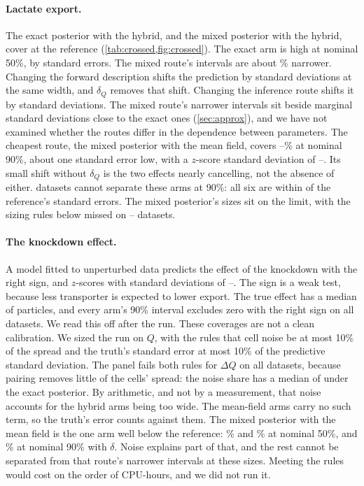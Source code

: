 \paragraph{Lactate export.} The exact posterior with the hybrid, and the mixed posterior
with the hybrid, cover at the reference (\cref{tab:crossed,fig:crossed}). The exact arm
is high at nominal 50\%, by  standard errors. The mixed route's
intervals are about \% narrower. Changing the forward description
shifts the prediction by  standard deviations at the same width, and $\delta_Q$ removes that shift. Changing the inference route shifts it by  standard deviations. The mixed route's narrower intervals sit beside marginal standard deviations close to the exact ones (\cref{sec:approx}), and we have not examined whether the routes differ in the dependence between parameters. The cheapest route, the mixed posterior with the mean field, covers
--\% at nominal 90\%, about one standard error low, with a $z$-score standard deviation of --. Its small shift without $\delta_Q$ is the two effects nearly cancelling, not the absence of
either.  datasets cannot separate these arms at 90\%: all six are within  of the reference's standard errors. The mixed posterior's sizes sit on the limit, with the sizing rules below missed on -- datasets.

\paragraph{The knockdown effect.} A model fitted to unperturbed data predicts the effect of the knockdown with the right sign, and $z$-scores with standard deviations of --. The sign is a weak test, because less transporter is expected to lower export. The true effect has a median of
 particles, and every arm's 90\% interval excludes zero with the right
sign on all  datasets. We read this off after the run. These coverages are
not a clean calibration. We sized the run on $Q$, with the rules that cell noise be at
most 10\% of the spread and the truth's standard error at most 10\% of the predictive
standard deviation. The panel fails both rules for $\Delta Q$ on all 
datasets, because pairing removes little of the cells' spread: the noise share has a
median of  under the exact posterior. By arithmetic, and not by a measurement, that noise accounts for the hybrid arms being too wide. The mean-field arms carry no such term,
so the truth's error counts against them. The mixed posterior with the mean field is the one arm well below the reference: \% and \% at nominal 50\%, and
\% at nominal 90\% with $\delta$. Noise explains part of that, and the
rest cannot be separated from that route's narrower intervals at these sizes. Meeting the
rules would cost on the order of  CPU-hours, and we did not run it.

